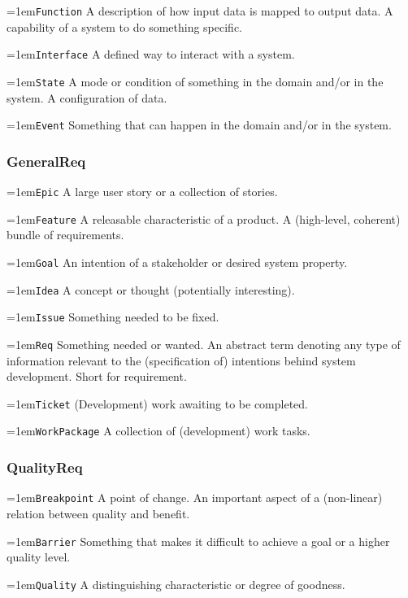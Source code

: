 \documentclass[9pt,a4paper,oneside]{report}
\begin{document}
\begin{multicols*}{4}
\hangindent=1em\lstinline+Function+ A description of how input data is mapped to output data. A capability of a system to do something specific.

\hangindent=1em\lstinline+Interface+ A defined way to interact with a system.

\hangindent=1em\lstinline+State+ A mode or condition of something in the domain and/or in the system. A configuration of data.

\hangindent=1em\lstinline+Event+ Something that can happen in the domain and/or in the system.

\subsubsection*{GeneralReq}

\hangindent=1em\lstinline+Epic+ A large user story or a collection of stories.

\hangindent=1em\lstinline+Feature+ A releasable characteristic of a product. A (high-level, coherent) bundle of requirements.

\hangindent=1em\lstinline+Goal+ An intention of a stakeholder or desired system property.

\hangindent=1em\lstinline+Idea+ A concept or thought (potentially interesting).

\hangindent=1em\lstinline+Issue+ Something needed to be fixed.

\hangindent=1em\lstinline+Req+ Something needed or wanted. An abstract term denoting any type of information relevant to the (specification of) intentions behind system development. Short for requirement.

\hangindent=1em\lstinline+Ticket+ (Development) work awaiting to be completed.

\hangindent=1em\lstinline+WorkPackage+ A collection of (development) work tasks.

\subsubsection*{QualityReq}

\hangindent=1em\lstinline+Breakpoint+ A point of change. An important aspect of a (non-linear) relation between quality and benefit.

\hangindent=1em\lstinline+Barrier+ Something that makes it difficult to achieve a goal or a higher quality level.

\hangindent=1em\lstinline+Quality+ A distinguishing characteristic or degree of goodness.


\end{multicols*}
\end{document}

